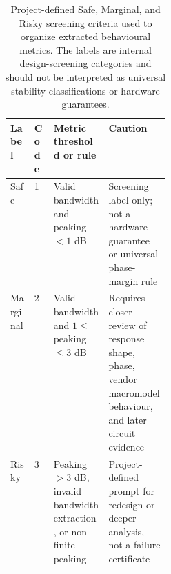 \begin{table}[htbp]
\centering
\small
\caption{Project-defined Safe, Marginal, and Risky screening criteria used to organize extracted behavioural metrics. The labels are internal design-screening categories and should not be interpreted as universal stability classifications or hardware guarantees.}
\label{tab:screening-criteria}
\begin{tabularx}{\linewidth}{p{0.15\linewidth} p{0.12\linewidth} X X}
\toprule
Label & Code & Metric threshold or rule & Caution \\
\midrule
Safe & 1 & Valid bandwidth and peaking $<1$ dB & Screening label only; not a hardware guarantee or universal phase-margin rule \\
Marginal & 2 & Valid bandwidth and $1 \leq$ peaking $\leq 3$ dB & Requires closer review of response shape, phase, vendor macromodel behaviour, and later circuit evidence \\
Risky & 3 & Peaking $>3$ dB, invalid bandwidth extraction, or non-finite peaking & Project-defined prompt for redesign or deeper analysis, not a failure certificate \\
\bottomrule
\end{tabularx}
\end{table}

